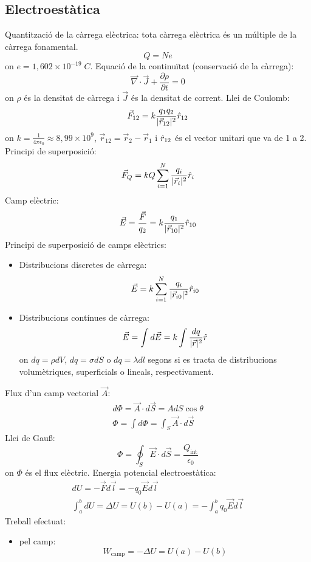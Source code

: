 \documentclass[../../../main.tex]{subfiles}
\begin{document}
\begin{multicols}{2}
\subsection{Electroestàtica}
Quantització de la càrrega elèctrica: tota càrrega elèctrica és un múltiple de la càrrega fonamental.
$$Q=Ne$$
{on $e=1,602\times10^{-19}\;C$.}\newline
Equació de la continuïtat (conservació de la càrrega): $$\Vec{\nabla}\cdot\Vec{J}+\frac{\partial\rho}{\partial t}=0$$
{on $\rho$ és la densitat de càrrega i $\Vec{J}$ és la densitat de corrent.}\newline
Llei de Coulomb: $$\Vec{F}_{12}=k\frac{q_1q_2}{|\Vec{r}_{12}|^2}\Hat{r}_{12}$$
{on $k=\frac{1}{4\pi\epsilon_0}\approx8,99\times10^9$, $\Vec{r}_{12}=\Vec{r}_2-\Vec{r}_1$ i $\Hat{r}_{12}$ és el vector unitari que va de 1 a 2.}\newline
Principi de superposició: $$\Vec{F}_Q=kQ\sum_{i=1}^N\frac{q_i}{|\Vec{r}_i|^2}\Hat{r}_i$$
Camp elèctric: $$\Vec{E}=\frac{\Vec{F}}{q_2}=k\frac{q_1}{|\Vec{r}_{10}|^2}\Hat{r}_{10}$$
Principi de superposició de camps elèctrics:
\begin{itemize}
    \item Distribucions discretes de càrrega:
    $$\Vec{E}=k\sum_{i=1}^N\frac{q_i}{|\Vec{r}_{i0}|^2}\Hat{r}_{i0}$$
    \item Distribucions contínues de càrrega:
    $$\Vec{E}=\int d\Vec{E}=k\int\frac{dq}{|\Vec{r}|^2}\Hat{r}$$
    {on $dq=\rho dV$, $dq=\sigma dS$ o $dq=\lambda dl$ segons si es tracta de distribucions volumètriques, superficials o lineals, respectivament.}
\end{itemize}
Flux d'un camp vectorial $\Vec{A}$: 
\begin{gather*}
    d\Phi=\Vec{A}\cdot d\Vec{S}=AdS\cos\theta\\
    \Phi=\int d\Phi=\int_S\Vec{A}\cdot d\Vec{S}
\end{gather*}
Llei de Gau\ss:
$$\Phi=\oint_S\Vec{E}\cdot d\Vec{S}=\frac{Q_{\text{int}}}{\epsilon_0}$${on $\Phi$ és el flux elèctric.}\newline
Energia potencial electroestàtica:
\begin{gather*}
    dU=-\Vec{F}d\Vec{l}=-q_0\Vec{E}d\Vec{l}\\
    \int_a^bdU=\Delta U=U(b)-U(a)=-\int_a^bq_0\Vec{E}d\Vec{l}
\end{gather*}
Treball efectuat:
\begin{itemize}
    \item pel camp: $$W_{\text{camp}}=-\Delta U=U(a)-U(b)$$

\end{itemize}
\end{multicols}
\end{document}
